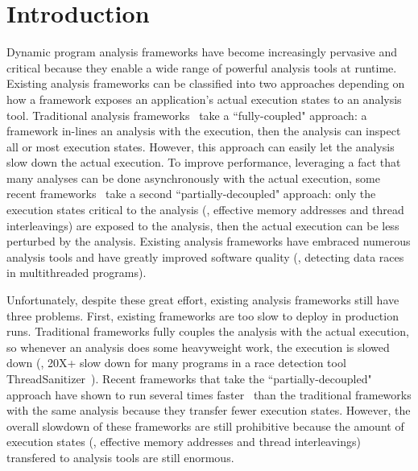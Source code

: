\section{Introduction} \label{sec:intro}



Dynamic program analysis frameworks have become increasingly pervasive and 
critical because they enable a wide range of powerful analysis tools at 
runtime. Existing analysis frameworks can be classified into two approaches 
depending on how a framework exposes an application's actual execution states 
to an analysis tool. Traditional analysis frameworks~\cite{dynamorio, 
pin:pldi05, valgrind:pldi, lift:micro06, tsan} take a ``fully-coupled" 
approach: a framework in-lines an analysis with the execution, then the analysis 
can inspect all or most execution states. However, this approach can easily let 
the analysis slow down the actual execution. To improve performance, leveraging 
a fact that many analyses can be done asynchronously with the actual execution, 
some recent frameworks~\cite{decouple:usenix08, speck:asplos08, 
shadowreplica:ccs13, 
wester:parallelizing:asplos13, superpin, jungwoo:oopsla09} take a second 
``partially-decoupled" approach: only the execution states critical to the 
analysis (\eg, effective memory addresses and thread interleavings) are exposed 
to the analysis, then the actual execution can be less perturbed by the 
analysis. Existing analysis frameworks have embraced numerous analysis tools 
and have greatly improved software quality (\eg, detecting data races in 
multithreaded programs).



Unfortunately, despite these great effort, existing analysis frameworks still 
have three problems. First, existing frameworks are too slow to deploy in 
production runs. Traditional frameworks fully couples the analysis with the 
actual execution, so whenever an analysis does some heavyweight work, the 
execution is slowed down (\eg, 20X+ slow down for many programs in a race 
detection tool ThreadSanitizer~\cite{tsan}). Recent frameworks that take the 
``partially-decoupled" approach have shown to run several times 
faster~\cite{shadowreplica:ccs13, wester:parallelizing:asplos13} than the 
traditional frameworks with the same analysis because they transfer fewer 
execution states. However, the overall slowdown of these frameworks are still 
prohibitive because the amount of execution states (\eg, effective memory 
addresses and thread interleavings) transfered to analysis tools are still 
enormous.


